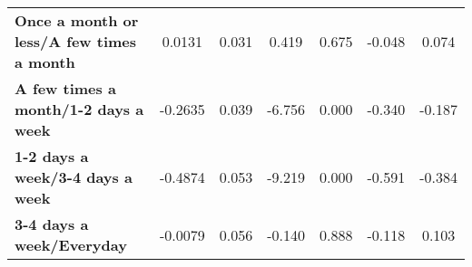 \documentclass{report}
\begin{document}
\begin{center}
\begin{tabular}{lcccccc}
\textbf{Once a month or less/A few times a month} &       0.0131  &        0.031     &     0.419  &         0.675        &       -0.048    &        0.074     \\
\textbf{A few times a month/1-2 days a week}      &      -0.2635  &        0.039     &    -6.756  &         0.000        &       -0.340    &       -0.187     \\
\textbf{1-2 days a week/3-4 days a week}          &      -0.4874  &        0.053     &    -9.219  &         0.000        &       -0.591    &       -0.384     \\
\textbf{3-4 days a week/Everyday}                 &      -0.0079  &        0.056     &    -0.140  &         0.888        &       -0.118    &        0.103     \\
\bottomrule
\end{tabular}
\end{center}
\end{document}

